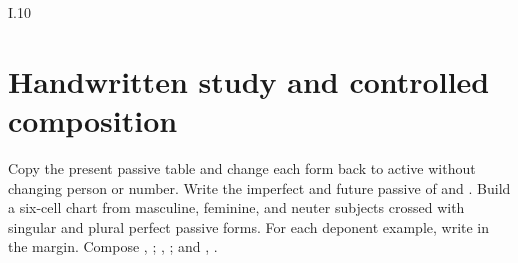 \begin{courseunit}{I.10}
\section{Handwritten study and controlled composition}

Copy the present passive table and change each form back to active without
changing person or number. Write the imperfect and future passive of
 and . Build a six-cell chart from masculine,
feminine, and neuter subjects crossed with singular and plural perfect passive
forms. For each deponent example, write 
in the margin. Compose , ;
,
; and ,
.



\end{courseunit}

